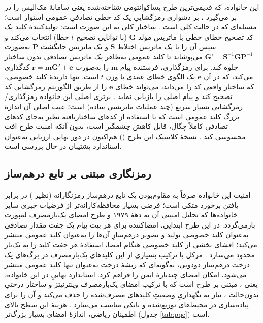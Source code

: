این خانواده، که قدیمی‌ترین طرح پساکوانتومی شناخته‌شده یعنی سامانهٔ مک‌الیس  را در بر می‌گیرد \Cite{mceliece1978}، بر دشواری رمزگشاییِ یک کد خطی تصادفیِ عمومی استوار است؛ مسئله‌ای که در حالت کلی  است \Cite{sendrier2017codebased}. ساختار کلی به این صورت است: تولیدکنندهٔ کلید یک کد تصحیح خطای خطی با ماتریس مولد $\mathbf{G}$ (با توانایی تصحیح $t$ خطا) انتخاب می‌کند و سپس آن را با یک ماتریس اختلاط $\mathbf{S}$ و یک ماتریس جایگشت $\mathbf{P}$ به‌صورت $\mathbf{G}' = \mathbf{S}^{-1}\mathbf{G}\mathbf{P}^{-1}$ می‌پوشاند تا کلید عمومی به‌ظاهر یک ماتریس تصادفی بدون ساختار جلوه کند. برای رمزگذاری، فرستنده پیام $\mathbf{m}$ را به‌صورت $\mathbf{r} = \mathbf{m}\mathbf{G}' + \mathbf{e}$ کدگذاری می‌کند، که در آن $\mathbf{e}$ یک الگوی خطای عمدی با وزن $t$ است. تنها دارندهٔ کلید خصوصی، که ساختار واقعی کد را می‌داند، می‌تواند خطای $\mathbf{e}$ را از طریق الگوریتم رمزگشایی کد تصحیح کند و پیام اصلی را بازیابی نماید \Cite{djordjevic2025pqc}. برتری اصلی این خانواده رمزگذاری/رمزگشایی بسیار سریع (چند عملیات ماتریسی ساده) است؛ عیب اصلی آن اندازهٔ بزرگ کلید عمومی است که با استفاده از کدهای ساختاریافته نظیر  به‌جای کدهای تصادفی کاملاً چگال، قابل کاهش چشمگیر است، بدون آنکه امنیت طرح افت محسوسی کند \Cite{sendrier2017codebased}. نسخهٔ کلاسیک این طرح () هم‌اکنون در دور نهایی ارزیابی  به‌عنوان استاندارد پشتیبان  در حال بررسی است.

\subsection{رمزنگاری مبتنی بر تابع درهم‌ساز }

امنیت این خانواده صرفاً به مقاوم‌بودن یک تابع درهم‌ساز رمزنگارانه (نظیر ) در برابر یافتن برخورد  متکی است؛ فرضی بسیار محافظه‌کارانه‌تر از فرضیات جبری سایر خانواده‌ها که تحلیل امنیتی آن به دههٔ ۱۹۷۹ و طرح امضای یک‌بارمصرف لمپورت  بازمی‌گردد. در این طرح ابتدایی، امضاکننده برای هر بیت پیام یک جفت مقدار تصادفی به‌عنوان کلید خصوصی تولید و تصویر درهم‌سازِ آن‌ها را به‌عنوان کلید عمومی منتشر می‌کند؛ افشای بخشی از کلید خصوصی هنگام امضا، استفادهٔ هر جفت کلید را به یک‌بار محدود می‌سازد \Cite{djordjevic2025pqc}. مرکل  با ترکیب بسیاری از این کلیدهای یک‌بارمصرف در برگ‌های یک درخت درهم‌ساز دودویی، به‌گونه‌ای که ریشهٔ درخت به‌عنوان تنها کلید عمومی منتشر می‌شود، امکان امضای چندبارهٔ ایمن را فراهم کرد. استاندارد نهاییِ  در این خانواده، یعنی ، مبتنی بر طرح  است که با ترکیب امضای یک‌بارمصرف وینترنیتز  و ساختار درختیِ بدون‌حالت ، نیاز به نگهداریِ وضعیتِ کلیدهای مصرف‌شده را حذف می‌کند و آن را برای پیاده‌سازی در محیط‌های توزیع‌شده و بانکی مناسب می‌سازد \Cite{bernstein2015sphincs}. هزینهٔ این سطح بالای اطمینان ریاضی، اندازهٔ امضای بسیار بزرگ‌تر (جدول \ref{tab:pqc}) است.

